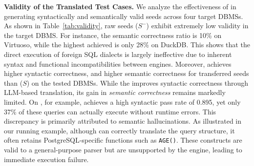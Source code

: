 \documentclass[sigconf,review,anonymous]{acmart}
\begin{document}
\textbf{Validity of the Translated Test Cases.}
We analyze the effectiveness of \tool{} in generating syntactically and semantically valid seeds across four target DBMSs. 
As shown in Table~\ref{tab:validity}, raw seeds ($S^-$) exhibit extremely low validity in the target DBMS. 
For instance, the semantic correctness ratio is 10\% on Virtuoso, while the highest achieved is only 28\% on DuckDB. 
This shows that the direct execution of foreign SQL dialects is largely ineffective due to inherent syntax and functional incompatibilities between engines.
Moreover, \tool{} achieves \synatxratio{} higher syntactic correctness, and \translateratio{} higher semantic correctness for transferred seeds than \sedar{} ($S$) on the tested DBMSs.
While the \sedar{} improves syntactic correctness through LLM-based translation, its gain in \textit{semantic correctness} remains markedly limited. 
On \duckdb{}, for example, \sedar{} achieves a high syntactic pass rate of 0.895, yet only 37\% of these queries can actually execute without runtime errors. This discrepancy is primarily attributed to semantic hallucinations. As illustrated in our running example, although \sedar{} can correctly translate the query structure, it often retains PostgreSQL-specific functions such as \texttt{AGE()}. These constructs are valid to a general-purpose parser but are unsupported by the \duckdb{} engine, leading to immediate execution failure.
\end{document}
